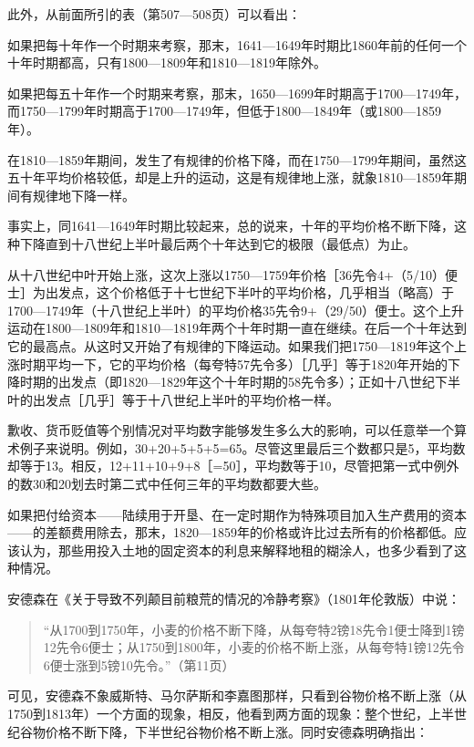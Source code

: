 此外，从前面所引的表（第507—508页）可以看出：

如果把每十年作一个时期来考察，那末，1641—1649年时期比1860年前的任何一个十年时期都高，只有1800—1809年和1810—1819年除外。

如果把每五十年作一个时期来考察，那末，1650—1699年时期高于1700—1749年，而1750—1799年时期高于1700—1749年，但低于1800—1849年（或1800—1859年）。

在1810—1859年期间，发生了有规律的价格下降，而在1750—1799年期间，虽然这五十年平均价格较低，却是上升的运动，这是有规律地上涨，就象1810—1859年期间有规律地下降一样。

事实上，同1641—1649年时期比较起来，总的说来，十年的平均价格不断下降，这种下降直到十八世纪上半叶最后两个十年达到它的极限（最低点）为止。

从十八世纪中叶开始上涨，这次上涨以1750—1759年价格［36先令4+（5/10）便士］为出发点，这个价格低于十七世纪下半叶的平均价格，几乎相当（略高）于1700—1749年（十八世纪上半叶）的平均价格35先令9+（29/50）便士。这个上升运动在1800—1809年和1810—1819年两个十年时期一直在继续。在后一个十年达到它的最高点。从这时又开始了有规律的下降运动。如果我们把1750—1819年这个上涨时期平均一下，它的平均价格（每夸特57先令多）［几乎］等于1820年开始的下降时期的出发点（即1820—1829年这个十年时期的58先令多）；正如十八世纪下半叶的出发点［几乎］等于十八世纪上半叶的平均价格一样。

歉收、货币贬值等个别情况对平均数字能够发生多么大的影响，可以任意举一个算术例子来说明。例如，30+20+5+5+5=65。尽管这里最后三个数都只是5，平均数却等于13。相反，12+11+10+9+8［=50］，平均数等于10，尽管把第一式中例外的数30和20划去时第二式中任何三年的平均数都要大些。

如果把付给资本——陆续用于开垦、在一定时期作为特殊项目加入生产费用的资本——的差额费用除去，那末，1820—1859年的价格或许比过去所有的价格都低。应该认为，那些用投入土地的固定资本的利息来解释地租的糊涂人，也多少看到了这种情况。


安德森在《关于导致不列颠目前粮荒的情况的冷静考察》（1801年伦敦版）中说：

\begin{quote}{“从1700到1750年，小麦的价格不断下降，从每夸特2镑18先令1便士降到1镑12先令6便士；从1750到1800年，小麦的价格不断上涨，从每夸特1镑12先令6便士涨到5镑10先令。”（第11页）}\end{quote}

可见，安德森不象威斯特、马尔萨斯和李嘉图那样，只看到谷物价格不断上涨（从1750到1813年）一个方面的现象，相反，他看到两方面的现象：整个世纪，上半世纪谷物价格不断下降，下半世纪谷物价格不断上涨。同时安德森明确指出：

